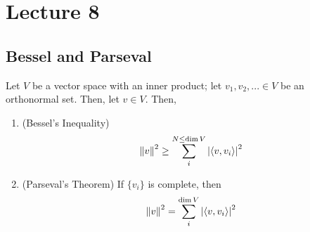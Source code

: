 \section{Lecture 8}
\subsection{Bessel and Parseval}
\begin{lemma}
    Let $V$ be a vector space with an inner product; let $v_1, v_2, ... \in V$ be an orthonormal set. Then, let $v \in V$. Then,
    \begin{enumerate}
        \item (Bessel's Inequality)
        $$\norm{v}^2 \ge \sum_i^{N \le \dim V} \abs{\langle v, v_i \rangle}^2$$
        \item (Parseval's Theorem) If $\{ v_i \}$ is complete, then
        $$\norm{v}^2 = \sum_i^{\dim V} \abs{\langle v, v_i \rangle}^2$$
    \end{enumerate}
\end{lemma}
